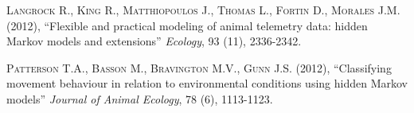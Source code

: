 \documentclass[]{article}
\begin{document}
\begin{thebibliography}{}

\textsc{Langrock R., King R., Matthiopoulos J., Thomas L., Fortin D., Morales J.M.} (2012),
``Flexible and practical modeling of animal telemetry data: hidden Markov models and extensions''
\textit{Ecology}, 93 (11), 2336-2342.

\textsc{Patterson T.A., Basson M., Bravington M.V., Gunn J.S.} (2012),
``Classifying movement behaviour in relation to environmental conditions using hidden Markov models''
\textit{Journal of Animal Ecology}, 78 (6), 1113-1123.

\end{thebibliography}
\end{document}
